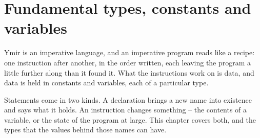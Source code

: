 \chapter{Fundamental types, constants and variables}
\label{chap:types}

Ymir is an imperative language, and an imperative program reads like a recipe:
one instruction after another, in the order written, each leaving the program a
little further along than it found it. What the instructions work on is data, and
data is held in constants and variables, each of a particular type.

Statements come in two kinds. A declaration brings a new name into existence and
says what it holds. An instruction changes something -- the contents of a
variable, or the state of the program at large. This chapter covers both, and the
types that the values behind those names can have.

\minitoc%









